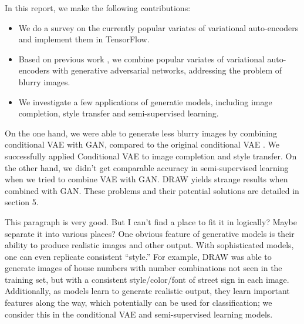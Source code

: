 \documentclass[10pt]{article}
\begin{document}
In this report, we make the following contributions:
\begin{itemize}
\item We do a survey on the currently popular variates of variational auto-encoders and implement them in TensorFlow.
\item Based on previous work \cite{larsen2015autoencoding}, we combine popular variates of variational auto-encoders with generative adversarial networks, addressing the problem of blurry images. 
\item We investigate a few applications of generatie models, including image completion, style transfer and semi-supervised learning. 
\end{itemize} 

On the one hand, we were able to generate less blurry images by combining conditional VAE with GAN, compared to the original conditional VAE \cite{sohn2015learning}. We successfully applied Conditional VAE to image completion and style transfer. On the other hand, we didn't get comparable accuracy in semi-supervised learning when we tried to combine VAE with GAN. DRAW yields strange results when combined with GAN. These problems and their potential solutions are detailed in section 5.   



This paragraph is very good. But I can't find a place to fit it in logically? Maybe separate it into various places?
One obvious feature of generative models is their ability to produce realistic images and other output. With sophisticated models, one can even replicate consistent ``style.'' For example, DRAW \cite{gregor2015draw} was able to generate images of house numbers with number combinations not seen in the training set, but with a consistent style/color/font of street sign in each image. Additionally, as models learn to generate realistic output, they learn important features along the way, which potentially can be used for classification; we consider this in the conditional VAE and semi-supervised learning models.


\end{document}
